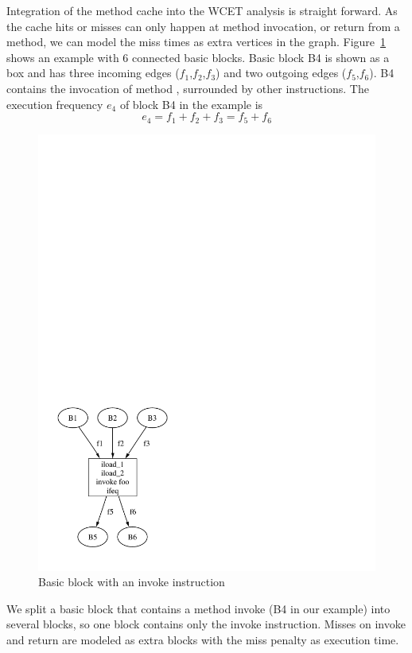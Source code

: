 Integration of the method cache into the WCET analysis is straight
forward. As the cache hits or misses can only happen at method
invocation, or return from a method, we can model the miss times as
extra vertices in the graph. Figure~\ref{fig:cache:bb} shows an
example with 6 connected basic blocks. Basic block B4 is shown as a
box and has three incoming edges ($f_1$,$f_2$,$f_3$) and two outgoing
edges ($f_5$,$f_6$). B4 contains the invocation of method
, surrounded by other instructions. The execution
frequency $e_4$ of block B4 in the example is
\begin{equation*}
    e_4 = f_1+f_2+f_3 = f_5+f_6
\end{equation*}

\begin{figure}
    \centering
    \includegraphics[scale=0.5]{wcet/cache_bb}
    \caption{Basic block with an invoke instruction}
    \label{fig:cache:bb}
\end{figure}

We split a basic block that contains a method invoke (B4 in our
example) into several blocks, so one block contains only the invoke
instruction. Misses on invoke and return are modeled as extra blocks
with the miss penalty as execution time.

